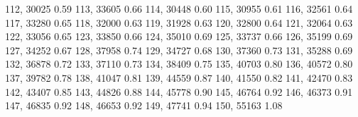 112,    30025   0.59 %
113,    33605   0.66 %
114,    30448   0.60 %
115,    30955   0.61 %
116,    32561   0.64 %
117,    33280   0.65 %
118,    32000   0.63 %
119,    31928   0.63 %
120,    32800   0.64 %
121,    32064   0.63 %
122,    33056   0.65 %
123,    33850   0.66 %
124,    35010   0.69 %
125,    33737   0.66 %
126,    35199   0.69 %
127,    34252   0.67 %
128,    37958   0.74 %
129,    34727   0.68 %
130,    37360   0.73 %
131,    35288   0.69 %
132,    36878   0.72 %
133,    37110   0.73 %
134,    38409   0.75 %
135,    40703   0.80 %
136,    40572   0.80 %
137,    39782   0.78 %
138,    41047   0.81 %
139,    44559   0.87 %
140,    41550   0.82 %
141,    42470   0.83 %
142,    43407   0.85 %
143,    44826   0.88 %
144,    45778   0.90 %
145,    46764   0.92 %
146,    46373   0.91 %
147,    46835   0.92 %
148,    46653   0.92 %
149,    47741   0.94 %
150,    55163   1.08 %